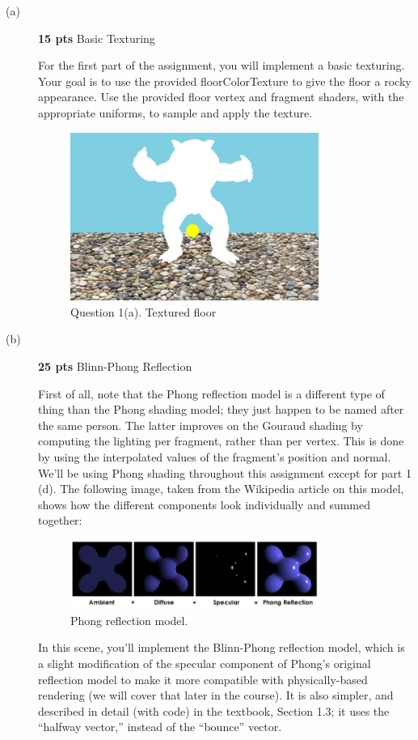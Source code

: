 \documentclass[12pt]{exam}
\begin{document}
\begin{description}
  
\item [(a)] {\bf 15 pts} Basic Texturing
\label{ref:simpleorb}

For the first part of the assignment, you will implement a basic texturing.  Your goal is to use the provided floorColorTexture
to give the floor a rocky appearance. Use the provided floor vertex and fragment shaders, with the appropriate uniforms, to sample
and apply the texture. 

    \begin{figure}[H]
    \centering
    \includegraphics[width=0.8\textwidth]{./q1.png}
    \caption{Question 1(a). Textured floor}
    \end{figure}

\item[(b)] {\bf 25 pts} Blinn-Phong Reflection
\label{ref:simpleorb}

  First of all, note that the Phong reflection model is a different type of thing
than the Phong shading model; they just happen to be named after the same
person. The latter improves on the Gouraud shading by computing the lighting
per fragment, rather than per vertex. This is done by using the interpolated values
of the fragment’s position and normal. We’ll be using Phong shading throughout
this assignment except for part 1 (d). The
following image, taken from the Wikipedia article on this model, shows how the
different components look individually and summed together:
    \begin{figure}[H]
    \centering
    \includegraphics[width=0.8\textwidth]{./pic2.png}
    \caption{Phong reflection model.}
    \end{figure}
In this scene, you’ll implement the Blinn-Phong reflection model, which is a 
slight modification of the specular component of Phong's original reflection model 
to make it more compatible with physically-based rendering (we will cover that later in the course).
It is also simpler, and described in detail (with code) in the textbook, Section 1.3; it uses the ``halfway vector,'' instead of the ``bounce'' vector. 


\end{description}
\end{document}
